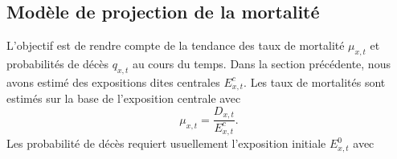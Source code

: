 \subsection{Modèle de projection de la mortalité}
L'objectif est de rendre compte de la tendance des taux de mortalité $\mu_{x,t}$ et probabilités de décès $q_{x,t}$ au cours du temps. Dans la section précédente, nous avons estimé des expositions dites centrales $E_{x,t}^c$. Les taux de mortalités sont estimés sur la base de l'exposition centrale avec 
$$
\mu_{x,t} = \frac{D_{x,t}}{E_{x,t}^c}.
$$
Les probabilité de décès requiert usuellement l'exposition initiale $E_{x,t}^0$ avec 

